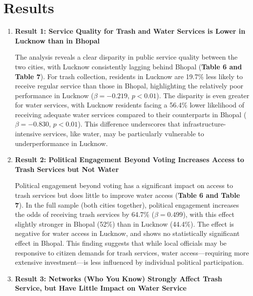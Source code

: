 \section{Results}
\begin{enumerate}[left=0pt]
    
    \item \textbf{Result 1: Service Quality for Trash and Water Services is Lower in Lucknow than in Bhopal}

    The analysis reveals a clear disparity in public service quality between the two cities, with Lucknow consistently lagging behind Bhopal (\textbf{Table 6 and Table 7}). For trash collection, residents in Lucknow are 19.7\% less likely to receive regular service than those in Bhopal, highlighting the relatively poor performance in Lucknow ($\beta = -0.219$, $p < 0.01$). The disparity is even greater for water services, with Lucknow residents facing a 56.4\% lower likelihood of receiving adequate water services compared to their counterparts in Bhopal ($\beta = -0.830$, $p < 0.01$). This difference underscores that infrastructure-intensive services, like water, may be particularly vulnerable to underperformance in Lucknow.

    \item \textbf{Result 2: Political Engagement Beyond Voting Increases Access to Trash Services but Not Water}

    Political engagement beyond voting has a significant impact on access to trash services but does little to improve water access (\textbf{Table 6 and Table 7}). In the full sample (both cities together), political engagement increases the odds of receiving trash services by 64.7\% ($\beta = 0.499$), with this effect slightly stronger in Bhopal (52\%) than in Lucknow (44.4\%). The effect is negative for water access in Lucknow, and shows no statistically significant effect in Bhopal. This finding suggests that while local officials may be responsive to citizen demands for trash services, water access—requiring more extensive investment—is less influenced by individual political participation.

    \item \textbf{Result 3: Networks (Who You Know) Strongly Affect Trash Service, but Have Little Impact on Water Service}


\end{enumerate}
